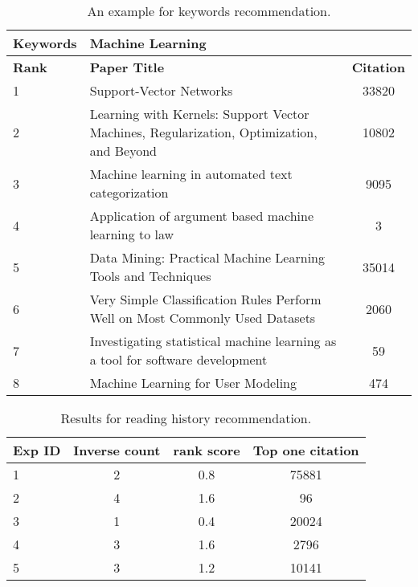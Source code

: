 \begin{table}
	\centering
	\begin{tabular}{lp{12cm}c}
		\textbf{Keywords}	& Machine Learning \\ \hline
		\toprule
		\textbf{Rank}		& \textbf{Paper Title} 		& \textbf{Citation} 	\\ \midrule
		1				&Support-Vector Networks 	&33820\\
		2				&Learning with Kernels: Support Vector Machines, Regularization, Optimization, and Beyond &10802\\
		3				&Machine learning in automated text categorization &9095\\
		4				&Application of argument based machine learning to law &3\\
		5				&Data Mining: Practical Machine Learning Tools and Techniques&35014\\
		6				&Very Simple Classification Rules Perform Well on Most Commonly Used Datasets&2060\\
		7				&Investigating statistical machine learning as a tool for software development &59\\
		8				&Machine Learning for User Modeling & 474\\
		\bottomrule
	\end{tabular}
	\vspace{3mm}
	\caption{An example for keywords recommendation. }
	\label{res:keywordexp}
\end{table}


\begin{table}
	\centering
	\begin{tabular}{lccc}
		\toprule
		\textbf{Exp ID} 	& \textbf{Inverse count} 	& \textbf{rank score} &\textbf{Top one citation}\\ \midrule
		1	& 2	& 0.8		&75881\\
		2	& 4	& 1.6		& 96 \\
		3	& 1	& 0.4		&20024 \\
		4	& 3	& 1.6		&2796\\
		5	& 3	& 1.2		&10141\\
		\bottomrule
	\end{tabular}
	\vspace{3mm}
	\caption{Results for reading history recommendation. }
	\label{res:patternall}
\end{table}

